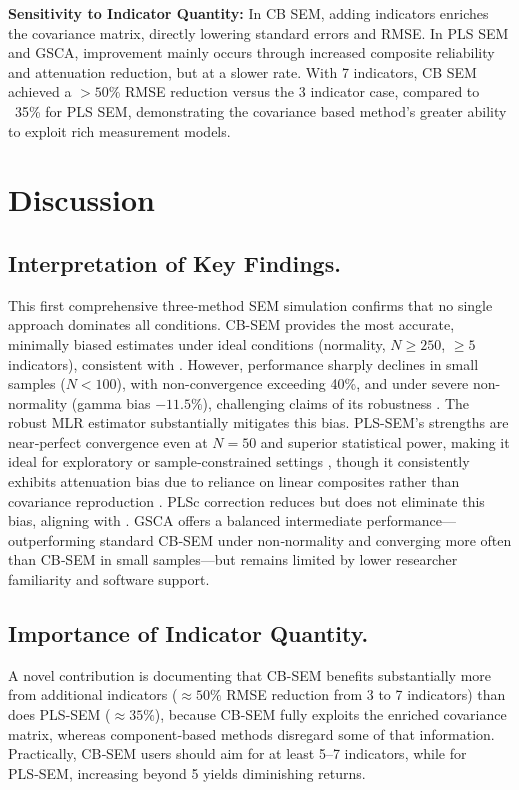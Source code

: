 \documentclass[twoside]{article}
\begin{document}
\textbf{Sensitivity to Indicator Quantity:} In CB SEM, adding indicators enriches the covariance matrix, directly lowering standard errors and RMSE. In PLS SEM and GSCA, improvement mainly occurs through increased composite reliability and attenuation reduction, but at a slower rate. With 7 indicators, CB SEM achieved a $>50\%$ RMSE reduction versus the 3 indicator case, compared to ~35\% for PLS SEM, demonstrating the covariance based method’s greater ability to exploit rich measurement models.
\section{Discussion}
\subsection{Interpretation of Key Findings.}
This first comprehensive three-method SEM simulation confirms that no single approach dominates all conditions. CB-SEM provides the most accurate, minimally biased estimates under ideal conditions (normality, \(N \geq 250\), \(\geq 5\) indicators), consistent with \cite{REINARTZ:2009}. However, performance sharply declines in small samples (\(N < 100\)), with non-convergence exceeding 40\%, and under severe non-normality (gamma bias \(-11.5\%\)), challenging claims of its robustness \cite{REINARTZ:2009}. The robust MLR estimator substantially mitigates this bias. PLS-SEM's strengths are near‑perfect convergence even at \(N = 50\) and superior statistical power, making it ideal for exploratory or sample‑constrained settings \cite{HAIR:2019}, though it consistently exhibits attenuation bias due to reliance on linear composites rather than covariance reproduction \cite{DIJKSTRA:2015}. PLSc correction reduces but does not eliminate this bias, aligning with  \cite{CIVELEK:2018}. GSCA offers a balanced intermediate performance---outperforming standard CB‑SEM under non‑normality and converging more often than CB‑SEM in small samples---but remains limited by lower researcher familiarity and software support.
\vspace{-1\baselineskip}
\subsection{Importance of Indicator Quantity.}
A novel contribution is documenting that CB-SEM benefits substantially more from additional indicators (\(\approx 50\%\) RMSE reduction from 3 to 7 indicators) than does PLS-SEM (\(\approx 35\%\)), because CB-SEM fully exploits the enriched covariance matrix, whereas component‑based methods disregard some of that information. Practically, CB‑SEM users should aim for at least 5--7 indicators, while for PLS‑SEM, increasing beyond 5 yields diminishing returns.
\vspace{-1\baselineskip}
\end{document}
